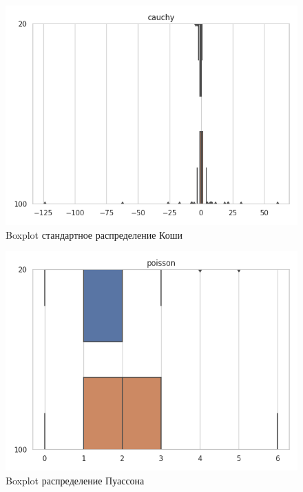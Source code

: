 \documentclass[12pt]{article}
\begin{document}
\begin{center}
\begin{figure}[H]
\caption{Boxplot стандартное распределение Коши }
\includegraphics[scale = 0.7]{cauchy.png} 
\end{figure}

\begin{figure}[H]
\caption{Boxplot распределение Пуассона }
\includegraphics[scale = 0.7]{poisson.png} 
\end{figure}


\end{center}
\end{document}
